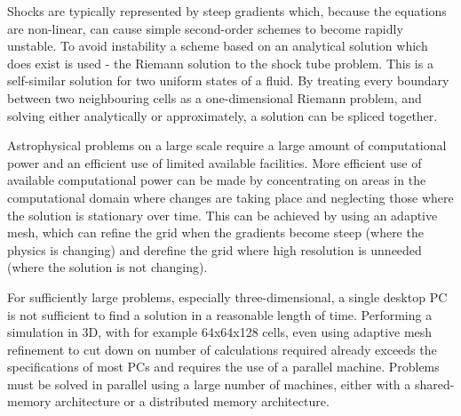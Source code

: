 Shocks are typically represented by steep gradients which, because the equations are non-linear, can cause simple second-order schemes to become rapidly unstable. 
To avoid instability a scheme based on an analytical solution which does exist is used - the Riemann solution to the shock tube problem.
This is a self-similar solution for two uniform states of a fluid. 
By treating every boundary between two neighbouring cells as a one-dimensional Riemann problem, and solving either analytically or approximately, a solution can be spliced together.

Astrophysical problems on a large scale require a large amount of computational
power and an efficient use of limited available facilities. More efficient use
of available computational power can be made by concentrating on areas in the
computational domain where changes are taking place and neglecting those where
the solution is stationary over time. This can be achieved by using an adaptive
mesh, which can refine the grid when the gradients become steep (where the
physics is changing) and derefine the grid where high resolution is unneeded
(where the solution is not changing).


For sufficiently large problems, especially three-dimensional, a single desktop PC is not sufficient to find a solution in a reasonable length of time.
Performing a simulation in 3D, with for example 64x64x128 cells, even using adaptive mesh refinement to cut down on number of calculations required already exceeds the specifications of most PCs and requires the use of a parallel machine.
Problems must be solved in parallel using a large number of machines, either with a shared-memory architecture or a distributed memory architecture.

